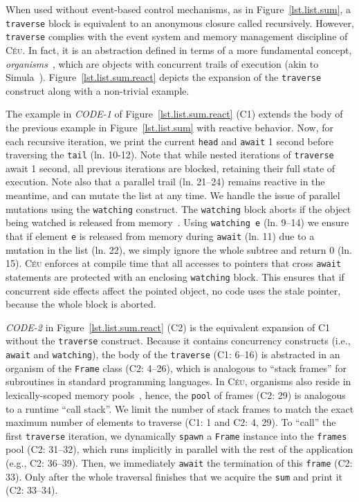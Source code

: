 \documentclass{sig-alternate}
\newcommand{\CEU}{\textsc{C\'{e}u}\xspace}
\newcommand{\code}[1] {{\small{\texttt{#1}}}}
\newcommand{\MM}[1] {\textcircled{\tiny{\textsf{#1}}}}
\begin{document}
When used without event-based control mechanisms, as in 
Figure~\ref{lst.list.sum}, a \code{traverse} block is equivalent to an 
anonymous closure called recursively.
%
However, \code{traverse} complies with the event system and memory management 
discipline of \CEU.
In fact, it is an abstraction defined in terms of a more fundamental concept, 
\emph{organisms}~\cite{ceu.mod15}, which are objects with concurrent trails of 
execution (akin to Simula~\cite{simula}).
%
Figure~\ref{lst.list.sum.react} depicts the expansion of the \code{traverse} 
construct along with a non-trivial example.

The example in \emph{CODE-1} of Figure~\ref{lst.list.sum.react} (\MM{C1}) 
extends the body of the previous example in Figure~\ref{lst.list.sum} with 
reactive behavior.
%
Now, for each recursive iteration, we print the current \code{head} 
and \code{await} 1 second before traversing the \code{tail} (ln. 10-12).
%
Note that while nested iterations of \code{traverse} await 1 second, all 
previous iterations are blocked, retaining their full state of execution.
%
Note also that a parallel trail (ln. 21--24) remains reactive in the 
meantime, and can mutate the list at any time.
%
We handle the issue of parallel mutations using the \code{watching} construct.
The \code{watching} block aborts if the object being watched
is released from memory~\cite{ceu.mod15}.
%
Using \code{watching e} (ln. 9--14) we ensure that if element \code{e}
is released from memory during \code{await} (ln. 11) due to a mutation in the 
list (ln. 22), we simply ignore the whole subtree and return 0 (ln. 15).
%
\CEU enforces at compile time that all accesses to pointers that cross 
\code{await} statements are protected with an enclosing \code{watching} block.
%
This ensures that if concurrent side effects affect the pointed object, no code 
uses the stale pointer, because the whole block is aborted.

\emph{CODE-2} in Figure~\ref{lst.list.sum.react} (\MM{C2}) is the equivalent 
expansion of \MM{C1} without the \code{traverse} construct.
%
Because it contains concurrency constructs (i.e., \code{await} and 
\code{watching}), the body of the \code{traverse} (\MM{C1}: 6--16) is 
abstracted in an organism of the \code{Frame} class (\MM{C2}: 4--26), which is 
analogous to ``stack frames'' for subroutines in standard programming 
languages.
%
In \CEU, organisms also reside in lexically-scoped memory 
pools~\cite{ceu.mod15}, hence, the \code{pool} of frames (\MM{C2}: 29) is 
analogous to a runtime ``call stack''.
We limit the number of stack frames to match the exact maximum number of 
elements to traverse (\MM{C1}: 1 and \MM{C2}: 4, 29).
%
To ``call'' the first \code{traverse} iteration, we dynamically \code{spawn} a 
\code{Frame} instance into the \code{frames} pool (\MM{C2}: 31--32), which runs 
implicitly in parallel with the rest of the application (e.g., \MM{C2}: 
36--39).
Then, we immediately \code{await} the termination of this \code{frame} 
(\MM{C2}: 33).
Only after the whole traversal finishes 
that we acquire the \code{sum} and print it (\MM{C2}: 33--34).
\end{document}
